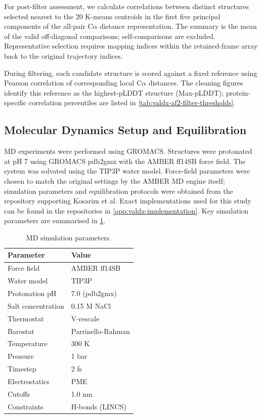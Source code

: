 For post-filter assessment, we calculate correlations between distinct structures selected nearest to the 20 K-means centroids in the first five principal components of the all-pair C$\alpha$ distance representation. The summary is the mean of the valid off-diagonal comparisons; self-comparisons are excluded. Representative selection requires mapping indices within the retained-frame array back to the original trajectory indices.

During filtering, each candidate structure is scored against a fixed reference using Pearson correlation of corresponding local C$\alpha$ distances. The cleaning figures identify this reference as the highest-pLDDT structure (Max-pLDDT); protein-specific correlation percentiles are listed in \cref{tab:valdx-af2-filter-thresholds}.

\subsection{Molecular Dynamics Setup and Equilibration}
\label{app:valdx-md-setup}

MD experiments were performed using GROMACS. Structures were protonated at pH 7 using GROMACS pdb2gmx with the AMBER ff14SB force field.\supercite{maierFf14SBImprovingAccuracy2015} The system was solvated using the TIP3P water model. Force-field parameters were chosen to match the original settings by the AMBER MD engine itself; simulation parameters and equilibration protocols were obtained from the repository supporting Kosarim et al.\supercite{kosarimMolecularDynamicsSimulations2024} Exact implementations used for this study can be found in the repositories in \cref{app:valdx-implementation}. Key simulation parameters are summarised in \cref{tab:valdx-md-parameters}.

\begin{table}[htbp]
    \centering
    \small
    \begin{tabular}{ll}
    \toprule
        \textbf{Parameter} & \textbf{Value} \\
        \midrule
        Force field & AMBER ff14SB \\
        Water model & TIP3P \\
        Protonation pH & 7.0 (pdb2gmx) \\
        Salt concentration & 0.15 M NaCl \\
        Thermostat & V-rescale \\
        Barostat & Parrinello-Rahman \\
        Temperature & 300 K \\
        Pressure & 1 bar \\
        Timestep & 2 fs \\
        Electrostatics & PME \\
        Cutoffs & 1.0 nm \\
        Constraints & H-bonds (LINCS) \\
        \bottomrule
    \end{tabular}
    \caption{MD simulation parameters.}
    \label{tab:valdx-md-parameters}
\end{table}

